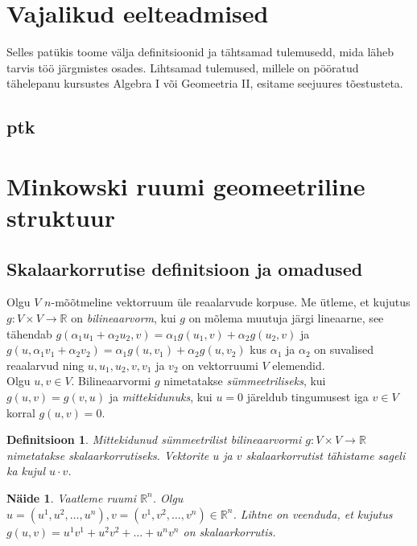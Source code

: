 \documentclass[a4paper,12pt]{article}
\newtheorem{definition}{Definitsioon}
\newtheorem{example}{Näide}
\numberwithin{equation}{section}
\begin{document}
\newpage

\section{Vajalikud eelteadmised}

Selles patükis toome välja definitsioonid ja tähtsamad tulemusedd, mida läheb tarvis töö järgmistes osades. Lihtsamad tulemused, millele on pööratud tähelepanu kursustes Algebra I või Geomeetria II, esitame seejuures tõestusteta.

\subsection{ptk}

\newpage

\section{Minkowski ruumi geomeetriline struktuur}

\subsection{Skalaarkorrutise definitsioon ja omadused}

Olgu $V$ $n$-mõõtmeline vektorruum üle reaalarvude korpuse. Me ütleme, et kujutus $g : V \times V \rightarrow \mathbb{R}$ on \textit{bilineaarvorm}, kui $g$ on mõlema muutuja järgi lineaarne, see tähendab $g \left( \alpha_1 u_1 + \alpha_2 u_2, v \right) = \alpha_1 g \left( u_1, v \right) + \alpha_2 g \left( u_2, v \right)$ ja $g \left( u, \alpha_1 v_1 + \alpha_2 v_2 \right) = \alpha_1 g \left( u, v_1 \right) + \alpha_2 g \left( u, v_2 \right)$ kus $\alpha_1$ ja $\alpha_2$ on suvalised reaalarvud ning $u, u_1, u_2, v, v_1$ ja $v_2$ on vektorruumi $V$ elemendid. 
\\
Olgu $u, v \in V$. Bilineaarvormi $g$ nimetatakse \textit{sümmeetriliseks}, kui $g \left( u, v \right) = g \left(v, u \right)$ ja \textit{mittekidunuks}, kui $u = 0$ järeldub tingumusest iga $v \in V$ korral $g \left( u, v \right) = 0$.

\begin{definition}
Mittekidunud sümmeetrilist bilineaarvormi $g:V \times V \rightarrow \mathbb{R}$ nimetatakse skalaarkorrutiseks. Vektorite $u$ ja $v$ skalaarkorrutist tähistame sageli ka kujul $u \cdot v$.
\end{definition}

\begin{example}
Vaatleme ruumi $\mathbb{R}^{n}$. Olgu $u = \left(u^1, u^2, \dots, u^n \right), v = \left(v^1, v^2, \dots, v^n \right) \in \mathbb{R}^{n}$. Lihtne on veenduda, et kujutus $g \left(u, v \right) = u^1v^1 + u^2v^2 + \dots + u^n v^n$ on skalaarkorrutis.
\end{example}
\end{document}
